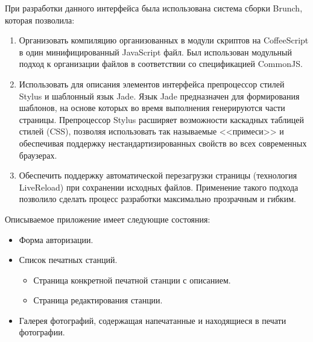 \documentclass[a4paper,14pt,href,draft]{article}
\begin{document}
При разработки данного интерфейса была использована система сборки Brunch\cite{Brunch}, которая позволила:

\begin{enumerate}
  \item Организовать компиляцию организованных в модули скриптов на CoffeeScript в один минифицированный JavaScript файл.
    Был использован модульный подход к организации файлов в соответствии со спецификацией CommonJS\cite{CommonJS}.

  \item Использовать для описания элементов интерфейса препроцессор стилей Stylus\cite{Stylus} и шаблонный язык
  Jade\cite{JadeLang}. Язык Jade предназначен для формирования шаблонов, на основе которых во время выполнения
  генерируются части страницы. Препроцессор Stylus расширяет возможности каскадных таблицей стилей (CSS), позволяя
  использовать так называемые <<примеси>> и обеспечивая поддержку нестандартизированных свойств во всех современных
  браузерах.

  \item Обеспечить поддержку автоматической перезагрузки страницы (технология LiveReload) при сохранении исходных файлов.
  Применение такого подхода позволило сделать процесс разработки максимально прозрачным и гибким.
\end{enumerate}

Описываемое приложение имеет следующие состояния:
\begin{itemize}
  \item Форма авторизации.

  \item Список печатных станций.
     \begin{itemize}
        \item Страница конкретной печатной станции с описанием.
        \item Страница редактирования станции.
     \end{itemize}

  \item Галерея фотографий, содержащая напечатанные и находящиеся в печати фотографии.
\end{itemize}
\end{document}
